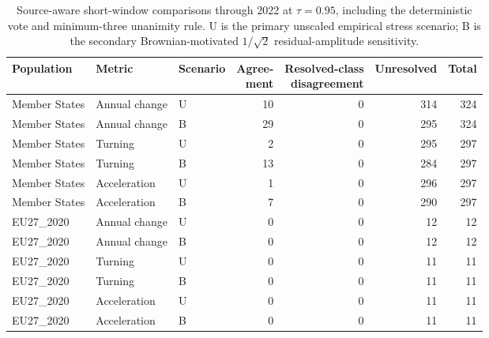 \begin{table}[htbp]
\centering
\small
\setlength{\tabcolsep}{4pt}
\caption{Source-aware short-window comparisons through 2022 at $\tau=0.95$, including the deterministic vote and minimum-three unanimity rule. U is the primary unscaled empirical stress scenario; B is the secondary Brownian-motivated $1/\sqrt{2}$ residual-amplitude sensitivity.}
\label{tab:shortwindow}
\begin{tabular}{lllrrrr}
\toprule
Population & Metric & Scenario & \shortstack{Agree-\\ment} & \shortstack{Resolved-class\\disagreement} & Unresolved & Total \\
\midrule
Member States & Annual change & U & 10 & 0 & 314 & 324 \\
Member States & Annual change & B & 29 & 0 & 295 & 324 \\
Member States & Turning & U & 2 & 0 & 295 & 297 \\
Member States & Turning & B & 13 & 0 & 284 & 297 \\
Member States & Acceleration & U & 1 & 0 & 296 & 297 \\
Member States & Acceleration & B & 7 & 0 & 290 & 297 \\
\midrule
EU27\_2020 & Annual change & U & 0 & 0 & 12 & 12 \\
EU27\_2020 & Annual change & B & 0 & 0 & 12 & 12 \\
EU27\_2020 & Turning & U & 0 & 0 & 11 & 11 \\
EU27\_2020 & Turning & B & 0 & 0 & 11 & 11 \\
EU27\_2020 & Acceleration & U & 0 & 0 & 11 & 11 \\
EU27\_2020 & Acceleration & B & 0 & 0 & 11 & 11 \\
\bottomrule
\end{tabular}
\end{table}
